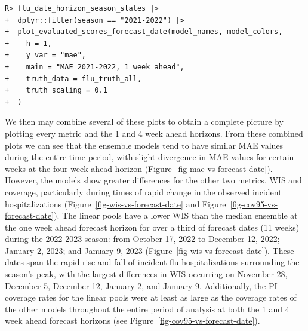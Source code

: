 \documentclass[
  article,
  shortnames,
  notitle]{jss}
\begin{document}
\begin{verbatim}
R> flu_date_horizon_season_states |>
+  dplyr::filter(season == "2021-2022") |>
+  plot_evaluated_scores_forecast_date(model_names, model_colors,
+    h = 1,
+    y_var = "mae",
+    main = "MAE 2021-2022, 1 week ahead",
+    truth_data = flu_truth_all,
+    truth_scaling = 0.1
+  )
\end{verbatim}

We then may combine several of these plots to obtain a complete picture
by plotting every metric and the 1 and 4 week ahead horizons. From these
combined plots we can see that the ensemble models tend to have similar
MAE values during the entire time period, with slight divergence in MAE
values for certain weeks at the four week ahead horizon
(Figure~\ref{fig-mae-vs-forecast-date}). However, the models show
greater differences for the other two metrics, WIS and coverage,
particularly during times of rapid change in the observed incident
hospitalizations (Figure~\ref{fig-wis-vs-forecast-date} and
Figure~\ref{fig-cov95-vs-forecast-date}). The linear pools have a lower
WIS than the median ensemble at the one week ahead forecast horizon for
over a third of forecast dates (11 weeks) during the 2022-2023 season:
from October 17, 2022 to December 12, 2022; January 2, 2023; and January
9, 2023 (Figure~\ref{fig-wis-vs-forecast-date}). These dates span the
rapid rise and fall of incident flu hospitalizations surrounding the
season's peak, with the largest differences in WIS occurring on November
28, December 5, December 12, January 2, and January 9. Additionally, the
PI coverage rates for the linear pools were at least as large as the
coverage rates of the other models throughout the entire period of
analysis at both the 1 and 4 week ahead forecast horizons (see
Figure~\ref{fig-cov95-vs-forecast-date}).
\end{document}
